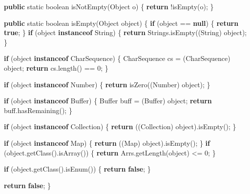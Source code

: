 \documentclass[
]{book}
\newenvironment{Shaded}{\begin{snugshade}}{\end{snugshade}}
\newcommand{\BuiltInTok}[1]{#1}
\newcommand{\DataTypeTok}[1]{\textcolor[rgb]{0.13,0.29,0.53}{#1}}
\newcommand{\DecValTok}[1]{\textcolor[rgb]{0.00,0.00,0.81}{#1}}
\newcommand{\FunctionTok}[1]{\textcolor[rgb]{0.00,0.00,0.00}{#1}}
\newcommand{\KeywordTok}[1]{\textcolor[rgb]{0.13,0.29,0.53}{\textbf{#1}}}
\newcommand{\NormalTok}[1]{#1}
\begin{document}
\begin{Shaded}
\begin{Highlighting}[]
    \KeywordTok{public} \DataTypeTok{static} \DataTypeTok{boolean} \FunctionTok{isNotEmpty}\NormalTok{(}\BuiltInTok{Object}\NormalTok{ o) \{}
        \KeywordTok{return}\NormalTok{ !}\FunctionTok{isEmpty}\NormalTok{(o);}
\NormalTok{    \}}

    \KeywordTok{public} \DataTypeTok{static} \DataTypeTok{boolean} \FunctionTok{isEmpty}\NormalTok{(}\BuiltInTok{Object}\NormalTok{ object) \{}
        \KeywordTok{if}\NormalTok{ (object == }\KeywordTok{null}\NormalTok{) \{}
            \KeywordTok{return} \KeywordTok{true}\NormalTok{;}
\NormalTok{        \}}
        \KeywordTok{if}\NormalTok{ (object }\KeywordTok{instanceof} \BuiltInTok{String}\NormalTok{) \{}
            \KeywordTok{return}\NormalTok{ Strings.}\FunctionTok{isEmpty}\NormalTok{((}\BuiltInTok{String}\NormalTok{) object);}
\NormalTok{        \}}

        \KeywordTok{if}\NormalTok{ (object }\KeywordTok{instanceof} \BuiltInTok{CharSequence}\NormalTok{) \{}
            \BuiltInTok{CharSequence}\NormalTok{ cs = (}\BuiltInTok{CharSequence}\NormalTok{) object;}
            \KeywordTok{return}\NormalTok{ cs.}\FunctionTok{length}\NormalTok{() == }\DecValTok{0}\NormalTok{;}
\NormalTok{        \}}

        \KeywordTok{if}\NormalTok{ (object }\KeywordTok{instanceof} \BuiltInTok{Number}\NormalTok{) \{}
            \KeywordTok{return} \FunctionTok{isZero}\NormalTok{((}\BuiltInTok{Number}\NormalTok{) object);}
\NormalTok{        \}}

        \KeywordTok{if}\NormalTok{ (object }\KeywordTok{instanceof} \BuiltInTok{Buffer}\NormalTok{) \{}
            \BuiltInTok{Buffer}\NormalTok{ buff = (}\BuiltInTok{Buffer}\NormalTok{) object;}
            \KeywordTok{return}\NormalTok{ buff.}\FunctionTok{hasRemaining}\NormalTok{();}
\NormalTok{        \}}

        \KeywordTok{if}\NormalTok{ (object }\KeywordTok{instanceof} \BuiltInTok{Collection}\NormalTok{) \{}
            \KeywordTok{return}\NormalTok{ ((}\BuiltInTok{Collection}\NormalTok{) object).}\FunctionTok{isEmpty}\NormalTok{();}
\NormalTok{        \}}

        \KeywordTok{if}\NormalTok{ (object }\KeywordTok{instanceof} \BuiltInTok{Map}\NormalTok{) \{}
            \KeywordTok{return}\NormalTok{ ((}\BuiltInTok{Map}\NormalTok{) object).}\FunctionTok{isEmpty}\NormalTok{();}
\NormalTok{        \}}
        \KeywordTok{if}\NormalTok{ (object.}\FunctionTok{getClass}\NormalTok{().}\FunctionTok{isArray}\NormalTok{()) \{}
            \KeywordTok{return}\NormalTok{ Arrs.}\FunctionTok{getLength}\NormalTok{(object) <= }\DecValTok{0}\NormalTok{;}
\NormalTok{        \}}

        \KeywordTok{if}\NormalTok{ (object.}\FunctionTok{getClass}\NormalTok{().}\FunctionTok{isEnum}\NormalTok{()) \{}
            \KeywordTok{return} \KeywordTok{false}\NormalTok{;}
\NormalTok{        \}}

        \KeywordTok{return} \KeywordTok{false}\NormalTok{;}
\NormalTok{    \}}
\end{Highlighting}
\end{Shaded}
\end{document}
